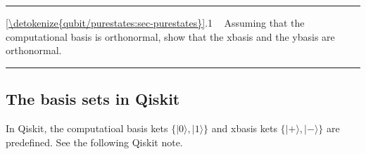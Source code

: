\documentclass[letterpaper,10pt,english]{jupyterBook}
\begin{document}
\bigskip\hrule\bigskip


\sphinxAtStartPar
{} \hyperref[\detokenize{qubit/purestates:sec-purestates}]{\ref{\detokenize{qubit/purestates:sec-purestates}}}.1    Assuming that the computational basis is orthonormal, show that the x\sphinxhyphen{}basis and the y\sphinxhyphen{}basis are orthonormal.


\bigskip\hrule\bigskip



\subsection{The basis sets in Qiskit}
\label{\detokenize{qubit/purestates:the-basis-sets-in-qiskit}}
\sphinxAtStartPar
In Qiskit, the computatioal basis kets \(\{|0\rangle, |1\rangle\}\) and x\sphinxhyphen{}basis kets \(\{|+\rangle, |-\rangle\}\) are predefined.  See the following Qiskit note.
\end{document}
